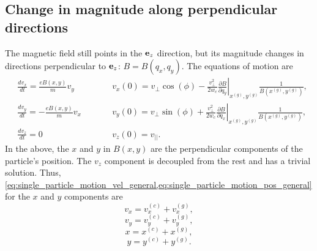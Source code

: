 \documentclass[a4paper,11pt]{report}
\begin{document}
\subsection{Change in magnitude along perpendicular directions}
The magnetic field still points in the $\mathbf{e}_z$ direction, but its magnitude changes in directions perpendicular to $\mathbf{e}_z$: $B = B(q_x,q_y)$. The equations of motion are
\begin{subequations}
\begin{alignat}{2}
    &\frac{d v_x}{dt} = \frac{eB(x,y)}{m} v_y  \qquad && v_x(0) = v_\perp \cos(\phi) -\frac{v^2_\perp}{2 w_c} \left . \frac{\partial B}{\partial q_y} \right |_{x^{(g)},y^{(g)}} \frac{1}{B(x^{(g)},y^{(g)})}, \label{eq:nonuniB_1} \\
    &\frac{d v_y}{dt} = -\frac{eB(x,y)}{m} v_x  \qquad && v_y(0) = v_\perp \sin(\phi) + \frac{v^2_\perp}{2 w_c} \left . \frac{\partial B}{\partial q_x} \right |_{x^{(g)},y^{(g)}} \frac{1}{B(x^{(g)},y^{(g)})}, \label{eq:nonuniB_2} \\
    &\frac{d v_z}{dt} = 0  \qquad && v_z(0) = v_{||}. \label{eq:nonuniB_3}
\end{alignat}
\end{subequations}
In the above, the $x$ and $y$ in $B(x,y)$ are the perpendicular components of the particle's position. The $v_z$ component is decoupled from the rest and has a trivial solution. Thus, \cref{eq:single_particle_motion_vel_general,eq:single_particle_motion_pos_general} for the $x$ and $y$ components are
\begin{equation}
    \label{eq:single_particle_motion_vel_Bmag_change_perp_1}
    v_x = v_x^{(c)} + v_x^{(g)},
\end{equation}
\begin{equation}
    \label{eq:single_particle_motion_vel_Bmag_change_perp_2}
    v_y = v_y^{(c)} + v_y^{(g)},
\end{equation}
\begin{equation}
    \label{eq:single_particle_motion_pos_Bmag_change_perp_1}
    x = x^{(c)} + x^{(g)},
\end{equation}
\begin{equation}
    \label{eq:single_particle_motion_pos_Bmag_change_perp_2}
    y = y^{(c)} + y^{(g)}.
\end{equation}
\end{document}
